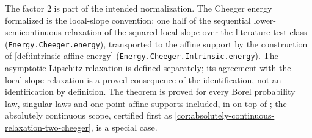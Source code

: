 The factor $2$ is part of the intended normalization. The Cheeger energy formalized is the
local-slope convention: one half of the sequential lower-semicontinuous relaxation of the squared
local slope over the literature test class (\texttt{Energy.Cheeger.energy}), transported to the
affine support by the construction of \cref{def:intrinsic-affine-energy}
(\texttt{Energy.Cheeger.Intrinsic.energy}). The asymptotic-Lipschitz relaxation is defined
separately; its agreement with the local-slope relaxation is a proved consequence of the
identification, not an identification by definition. The theorem is proved for every Borel
probability law, singular laws and one-point affine supports included, in
 on top of ; the
absolutely continuous scope, certified first as
\cref{cor:absolutely-continuous-relaxation-two-cheeger}, is a special case.

